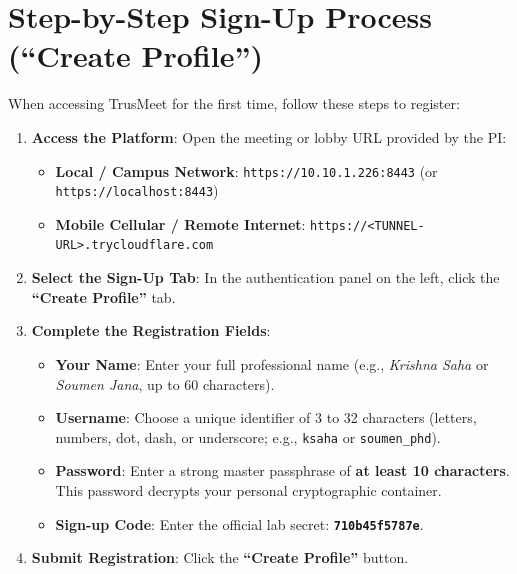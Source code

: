 \documentclass[11pt,a4paper]{report}
\begin{document}
\section{Step-by-Step Sign-Up Process (``Create Profile'')}
When accessing TrusMeet for the first time, follow these steps to register:
\begin{enumerate}
    \item \textbf{Access the Platform}: Open the meeting or lobby URL provided by the PI:
    \begin{itemize}
        \item \textbf{Local / Campus Network}: \texttt{https://10.10.1.226:8443} (or \texttt{https://localhost:8443})
        \item \textbf{Mobile Cellular / Remote Internet}: \texttt{https://<TUNNEL-URL>.trycloudflare.com}
    \end{itemize}
    \item \textbf{Select the Sign-Up Tab}: In the authentication panel on the left, click the \textbf{``Create Profile''} tab.
    \item \textbf{Complete the Registration Fields}:
    \begin{itemize}
        \item \textbf{Your Name}: Enter your full professional name (e.g., \textit{Krishna Saha} or \textit{Soumen Jana}, up to 60 characters).
        \item \textbf{Username}: Choose a unique identifier of 3 to 32 characters (letters, numbers, dot, dash, or underscore; e.g., \texttt{ksaha} or \texttt{soumen\_phd}).
        \item \textbf{Password}: Enter a strong master passphrase of \textbf{at least 10 characters}. This password decrypts your personal cryptographic container.
        \item \textbf{Sign-up Code}: Enter the official lab secret: \texttt{\textbf{710b45f5787e}}.
    \end{itemize}
    \item \textbf{Submit Registration}: Click the \textbf{``Create Profile''} button.
\end{enumerate}
\end{document}
